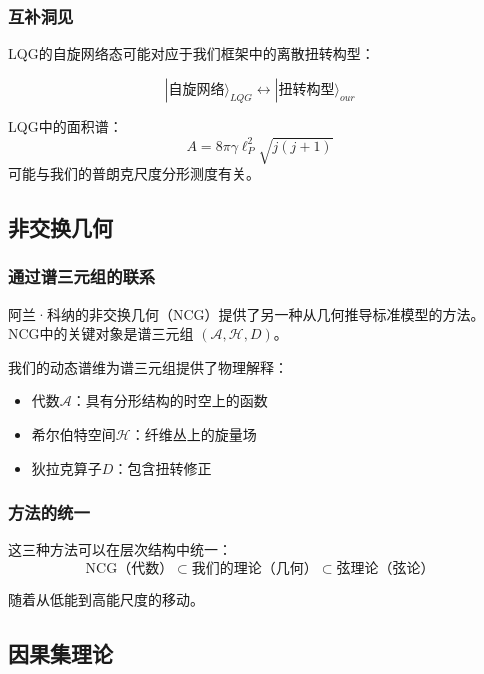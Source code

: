 \subsubsection{互补洞见}

LQG的自旋网络态可能对应于我们框架中的离散扭转构型：

\begin{equation}
    |\text{自旋网络}\rangle_{LQG} \longleftrightarrow |\text{扭转构型}\rangle_{our}
\end{equation}

LQG中的面积谱：
\begin{equation}
    A = 8\pi\gamma\ell_P^2 \sqrt{j(j+1)}
\end{equation}
可能与我们的普朗克尺度分形测度有关。

\subsection{非交换几何}

\subsubsection{通过谱三元组的联系}

阿兰·科纳的非交换几何（NCG）提供了另一种从几何推导标准模型的方法。NCG中的关键对象是谱三元组 $(\mathcal{A}, \mathcal{H}, D)$。

我们的动态谱维为谱三元组提供了物理解释：
\begin{itemize}
    \item 代数$\mathcal{A}$：具有分形结构的时空上的函数
    \item 希尔伯特空间$\mathcal{H}$：纤维丛上的旋量场
    \item 狄拉克算子$D$：包含扭转修正
\end{itemize}

\subsubsection{方法的统一}

这三种方法可以在层次结构中统一：
\begin{equation}
    \text{NCG（代数）} \subset \text{我们的理论（几何）} \subset \text{弦理论（弦论）}
\end{equation}

随着从低能到高能尺度的移动。

\subsection{因果集理论}

